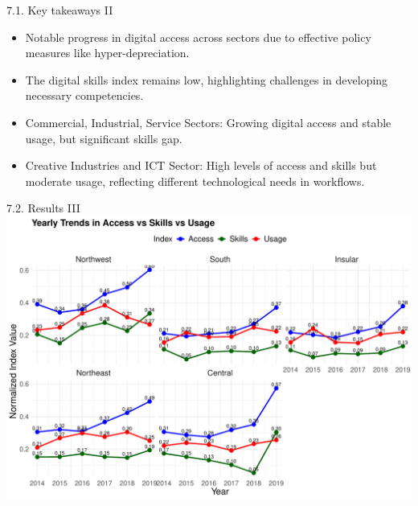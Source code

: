 \documentclass[
  ignorenonframetext,
]{beamer}
\begin{document}
\begin{frame}{7.1. Key takeaways II}
\label{key-takeaways-ii}
\begin{itemize}
\item
  Notable progress in digital access across sectors due to effective
  policy measures like hyper-depreciation.
\item
  The digital skills index remains low, highlighting challenges in
  developing necessary competencies.
\item
  Commercial, Industrial, Service Sectors: Growing digital access and
  stable usage, but significant skills gap.
\item
  Creative Industries and ICT Sector: High levels of access and skills
  but moderate usage, reflecting different technological needs in
  workflows.
\end{itemize}
\end{frame}

\begin{frame}{7.2. Results III}
\label{results-iii}
\includegraphics{Chapter_3_files/figure-beamer/yearTrendReg-1.pdf}
\end{frame}
\end{document}
